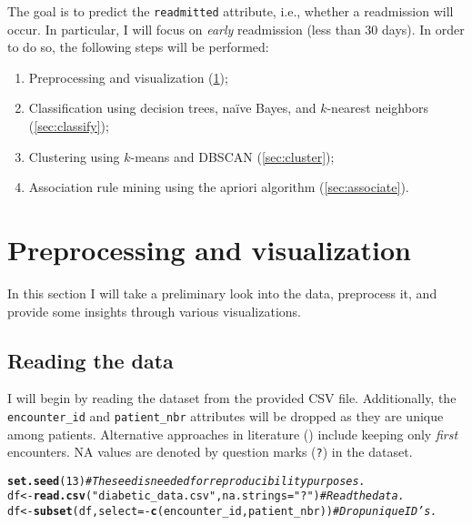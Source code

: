 \documentclass{article}\usepackage[]{graphicx}\usepackage[]{color}
\makeatletter
\newcommand{\hlnum}[1]{\textcolor[rgb]{0.686,0.059,0.569}{#1}}%
\newcommand{\hlstr}[1]{\textcolor[rgb]{0.192,0.494,0.8}{#1}}%
\newcommand{\hlcom}[1]{\textcolor[rgb]{0.678,0.584,0.686}{\textit{#1}}}%
\newcommand{\hlopt}[1]{\textcolor[rgb]{0,0,0}{#1}}%
\newcommand{\hlstd}[1]{\textcolor[rgb]{0.345,0.345,0.345}{#1}}%
\newcommand{\hlkwb}[1]{\textcolor[rgb]{0.69,0.353,0.396}{#1}}%
\newcommand{\hlkwc}[1]{\textcolor[rgb]{0.333,0.667,0.333}{#1}}%
\newcommand{\hlkwd}[1]{\textcolor[rgb]{0.737,0.353,0.396}{\textbf{#1}}}%
\newenvironment{kframe}{%
 \def\at@end@of@kframe{}%
 \ifinner\ifhmode%
  \def\at@end@of@kframe{\end{minipage}}%
  \begin{minipage}{\columnwidth}%
 \fi\fi%
 \def\FrameCommand##1{\hskip\@totalleftmargin \hskip-\fboxsep
 \colorbox{shadecolor}{##1}\hskip-\fboxsep
     \hskip-\linewidth \hskip-\@totalleftmargin \hskip\columnwidth}%
 \MakeFramed {\advance\hsize-\width
   \@totalleftmargin\z@ \linewidth\hsize
   \@setminipage}}%
 {\par\unskip\endMakeFramed%
 \at@end@of@kframe}
\newenvironment{knitrout}{}{} %
\makeatother
\begin{document}
The goal is to predict the \texttt{readmitted} attribute, i.e., whether a
readmission will occur.  In particular, I will focus on \emph{early} readmission
(less than \num{30} days).  In order to do so, the following steps will be
performed:
\begin{enumerate}
\item Preprocessing and visualization (\cref{sec:preprocess-and-visualize});
\item Classification using decision trees, naïve Bayes, and $k$-nearest
  neighbors (\cref{sec:classify});
\item Clustering using $k$-means and DBSCAN (\cref{sec:cluster});
\item Association rule mining using the apriori algorithm
  (\cref{sec:associate}).
\end{enumerate}

\section{Preprocessing and visualization}\label{sec:preprocess-and-visualize}
In this section I will take a preliminary look into the data, preprocess it, and
provide some insights through various visualizations.

\subsection{Reading the data}

I will begin by reading the dataset from the provided CSV file.  Additionally,
the \texttt{encounter\_id} and \texttt{patient\_nbr} attributes will be dropped
as they are unique among patients.  Alternative approaches in literature
(\autocite{Str+14}) include keeping only \emph{first} encounters.  NA values are
denoted by question marks (\texttt{?}) in the dataset.

\begin{knitrout}
\color{fgcolor}\begin{kframe}
\begin{alltt}
\hlkwd{set.seed}\hlstd{(}\hlnum{13}\hlstd{)}  \hlcom{# The seed is needed for reproducibility purposes.}
\hlstd{df} \hlkwb{<-} \hlkwd{read.csv}\hlstd{(}\hlstr{"diabetic_data.csv"}\hlstd{,} \hlkwc{na.strings}\hlstd{=}\hlstr{"?"}\hlstd{)}     \hlcom{# Read the data.}
\hlstd{df} \hlkwb{<-} \hlkwd{subset}\hlstd{(df,} \hlkwc{select}\hlstd{=}\hlopt{-}\hlkwd{c}\hlstd{(encounter_id, patient_nbr))}  \hlcom{# Drop unique ID's.}
\end{alltt}
\end{kframe}
\end{knitrout}
\end{document}
